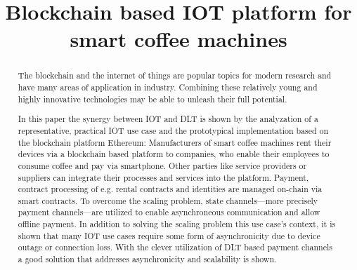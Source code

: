 \documentclass[conference]{IEEEtran}
\begin{document}
\title{Blockchain based IOT platform for smart coffee machines\\
}

\author{

  \and


  \and

}

\maketitle

\begin{abstract}
  The blockchain and the internet of things are popular topics for modern research and have many areas of application in industry. Combining these relatively young and highly innovative technologies may be able to unleash their full potential.

  In this paper the synergy between IOT and DLT is shown by the analyzation of a representative, practical IOT use case and the prototypical implementation based on the blockchain platform Ethereum: Manufacturers of smart coffee machines rent their devices via a blockchain based platform to companies, who enable their employees to consume coffee and pay via smartphone. Other parties like service providers or suppliers can integrate their processes and services into the platform. Payment, contract processing of e.g. rental contracts and identities are managed on-chain via smart contracts. To overcome the scaling problem, state channels---more precisely payment channels---are utilized to enable asynchroneous communication and allow offline payment. In addition to solving the scaling problem this use case's context, it is shown that many IOT use cases require some form of asynchronicity due to device outage or connection loss. With the clever utilization of DLT based payment channels a good solution that addresses asynchronicity and scalability is shown.

\end{abstract}
\end{document}
